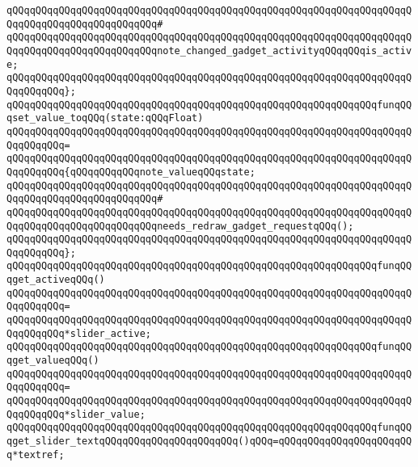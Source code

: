 \verb|qQQqqQQqqQQqqQQqqQQqqQQqqQQqqQQqqQQqqQQqqQQqqQQqqQQqqQQqqQQqqQQqqQQqqQQqqQQqqQQqqQQqqQQqqQQqqQQq#|\newline
\verb|qQQqqQQqqQQqqQQqqQQqqQQqqQQqqQQqqQQqqQQqqQQqqQQqqQQqqQQqqQQqqQQqqQQqqQQqqQQqqQQqqQQqqQQqqQQqqQQqnote_changed_gadget_activityqQQqqQQqis_active;|\newline
\verb|qQQqqQQqqQQqqQQqqQQqqQQqqQQqqQQqqQQqqQQqqQQqqQQqqQQqqQQqqQQqqQQqqQQqqQQqqQQqqQQq};|\newline
\newline
\verb|qQQqqQQqqQQqqQQqqQQqqQQqqQQqqQQqqQQqqQQqqQQqqQQqqQQqqQQqqQQqqQQqfunqQQqset_value_toqQQq(state:qQQqFloat)|\newline
\verb|qQQqqQQqqQQqqQQqqQQqqQQqqQQqqQQqqQQqqQQqqQQqqQQqqQQqqQQqqQQqqQQqqQQqqQQqqQQqqQQq=|\newline
\verb|qQQqqQQqqQQqqQQqqQQqqQQqqQQqqQQqqQQqqQQqqQQqqQQqqQQqqQQqqQQqqQQqqQQqqQQqqQQqqQQq{qQQqqQQqqQQqnote_valueqQQqstate;|\newline
\verb|qQQqqQQqqQQqqQQqqQQqqQQqqQQqqQQqqQQqqQQqqQQqqQQqqQQqqQQqqQQqqQQqqQQqqQQqqQQqqQQqqQQqqQQqqQQqqQQq#|\newline
\verb|qQQqqQQqqQQqqQQqqQQqqQQqqQQqqQQqqQQqqQQqqQQqqQQqqQQqqQQqqQQqqQQqqQQqqQQqqQQqqQQqqQQqqQQqqQQqqQQqneeds_redraw_gadget_requestqQQq();|\newline
\verb|qQQqqQQqqQQqqQQqqQQqqQQqqQQqqQQqqQQqqQQqqQQqqQQqqQQqqQQqqQQqqQQqqQQqqQQqqQQqqQQq};|\newline
\newline
\verb|qQQqqQQqqQQqqQQqqQQqqQQqqQQqqQQqqQQqqQQqqQQqqQQqqQQqqQQqqQQqqQQqfunqQQqget_activeqQQq()|\newline
\verb|qQQqqQQqqQQqqQQqqQQqqQQqqQQqqQQqqQQqqQQqqQQqqQQqqQQqqQQqqQQqqQQqqQQqqQQqqQQqqQQq=|\newline
\verb|qQQqqQQqqQQqqQQqqQQqqQQqqQQqqQQqqQQqqQQqqQQqqQQqqQQqqQQqqQQqqQQqqQQqqQQqqQQqqQQq*slider_active;|\newline
\newline
\verb|qQQqqQQqqQQqqQQqqQQqqQQqqQQqqQQqqQQqqQQqqQQqqQQqqQQqqQQqqQQqqQQqfunqQQqget_valueqQQq()|\newline
\verb|qQQqqQQqqQQqqQQqqQQqqQQqqQQqqQQqqQQqqQQqqQQqqQQqqQQqqQQqqQQqqQQqqQQqqQQqqQQqqQQq=|\newline
\verb|qQQqqQQqqQQqqQQqqQQqqQQqqQQqqQQqqQQqqQQqqQQqqQQqqQQqqQQqqQQqqQQqqQQqqQQqqQQqqQQq*slider_value;|\newline
\newline
\newline
\newline
\verb|qQQqqQQqqQQqqQQqqQQqqQQqqQQqqQQqqQQqqQQqqQQqqQQqqQQqqQQqqQQqqQQqfunqQQqget_slider_textqQQqqQQqqQQqqQQqqQQqqQQq()qQQq=qQQqqQQqqQQqqQQqqQQqqQQq*textref;|\newline
